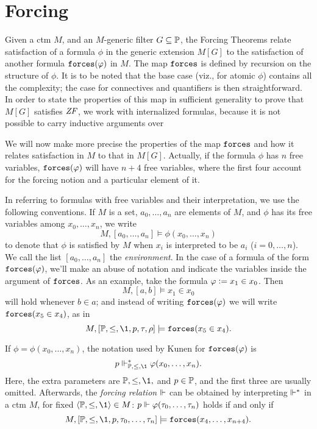 \section{Forcing}
\label{sec:forcing}

Given a ctm $M$, and an $M$-generic filter $G\subseteq\mathbb{P}$, the Forcing
Theorems relate satisfaction of a formula 
$\phi$ in the generic extension $M[G]$ to the satisfaction of another
formula $\mathop{\mathtt{forces}}(\varphi)$ in $M$. The map $\mathop{\mathtt{forces}}$ is defined by
recursion on 
the structure of $\phi$. It is to be noted that the base case (viz.,
for atomic $\phi$) contains all the complexity; the case for
connectives and quantifiers is then straightforward.
In order to state the properties of this map
in sufficient generality to prove that  $M[G]$ satisfies $\mathit{ZF}$, we work with
internalized formulas, because it is not possible to carry inductive
arguments over \tyo

We will now make more precise the properties of the map
$\mathop{\mathtt{forces}}$ and how it relates satisfaction in $M$ to that in
$M[G]$. Actually, if the formula $\phi$ has $n$ free variables,
$\mathop{\mathtt{forces}}(\varphi)$ will have $n+4$ free variables, where the first four account
for the forcing notion and a particular element of it. 

In referring to formulas with free variables and their interpretation,
we use the following conventions. If  $M$ is a set, $a_0,\dots,a_n$
are elements of $M$, and $\phi$ has its free variables
among $x_0,\dots,x_n$, we write
\[
M,[a_0,\dots,a_n] \models \phi(x_0,\dots,x_n)
\]
to denote that $\phi$ is satisfied by $M$ when $x_i$ is interpreted
to be $a_i$ ($i=0,\dots,n$). We call the list $[a_0,\dots,a_n]$ the
\emph{environment}. In the case of a formula of the form
$\mathop{\mathtt{forces}}(\varphi)$, we'll make an abuse of notation and indicate the
variables inside the argument of $\mathop{\mathtt{forces}}$. As an example, take the
formula $\varphi\mathrel{\mathop:}= x_1\in x_0$. Then
\[
M,[a,b] \models x_1\in x_0
\]
will hold whenever $b\in a$; and instead of writing $\mathop{\mathtt{forces}}(\varphi)$
we will write $\mathop{\mathtt{forces}}(x_5\in x_4)$, as in
\[
M,[\PP,\leq,\1,p,\tau,\rho] \models \forceisa(x_5\in x_4).
\]

If
$\phi=\phi(x_0,\dots,x_n)$, the notation used by Kunen
\cite{kunen2011set,kunen1980} for $\mathop{\mathtt{forces}}(\varphi)$ is 
\[
p\forces_{\PP,\leq,\1}^* \phi(x_0,\dots,x_n).
\]
Here, the extra parameters are $\PP,\leq,\1,$ and $p\in\mathbb{P}$, and the
first three are usually omitted. %
Afterwards, the \emph{forcing relation}
$\Vdash$ can be obtained by 
interpreting $\Vdash^*$ in a ctm $M$, for fixed
$\lb\PP,\leq,\1\rb\in M$: $p\Vdash \varphi(\tau_0,\dots,\tau_n)$ holds
if and only if
\begin{equation}\label{eq:3}
M,[\PP,\leq,\1,p,\tau_0,\dots,\tau_n]\models \forceisa(x_4,\dots,x_{n+4}).
\end{equation}

